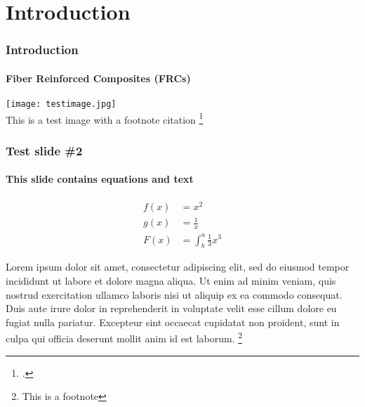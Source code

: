 \section{Introduction}
\begin{frame}

	\frametitle{Introduction}
	\framesubtitle{Fiber Reinforced Composites (FRCs)}

	\begin{center}
		\texttt{[image: testimage.jpg]} \\
		This is a test image with a footnote citation \footcite{CitekeyArticle} 
		
	\end{center}

\end{frame}
\begin{frame}

	\frametitle{Test slide \#2}
	\framesubtitle{This slide contains equations and text}
	
	\hfill
	
	\begin{align*}
	f(x) &= x^2\\
	g(x) &= \frac{1}{x}\\
	F(x) &= \int^a_b \frac{1}{3}x^3
	\end{align*}
	
	\hfill
	
	Lorem ipsum dolor sit amet, consectetur adipiscing elit, sed do eiusmod tempor incididunt ut labore et dolore magna aliqua. Ut enim ad minim veniam, quis nostrud exercitation ullamco laboris nisi ut aliquip ex ea commodo consequat. Duis aute irure dolor in reprehenderit in voluptate velit esse cillum dolore eu fugiat nulla pariatur. Excepteur sint occaecat cupidatat non proident, sunt in culpa qui officia deserunt mollit anim id est laborum. \footnote{This is a footnote}
	
	\hfill
	
\end{frame}
